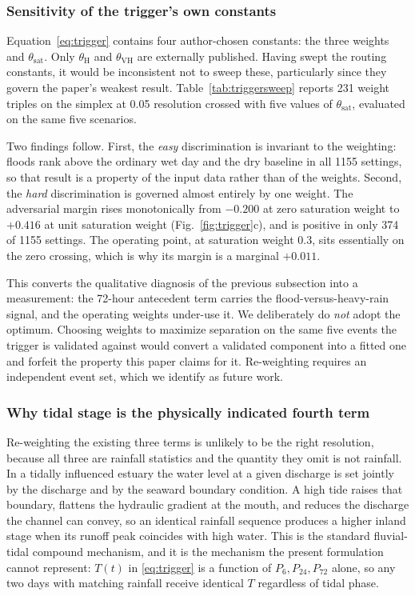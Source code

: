 \documentclass[10pt,twocolumn]{article}
\newcommand{\Tt}{T(t)}
\begin{document}
\subsubsection*{Sensitivity of the trigger's own constants}
\label{sec:res-trigger-sweep}
Equation~\eqref{eq:trigger} contains four author-chosen constants: the three
weights and $\theta_{\mathrm{sat}}$. Only $\theta_{\mathrm{H}}$ and
$\theta_{\mathrm{VH}}$ are externally published. Having swept the routing
constants, it would be inconsistent not to sweep these, particularly since they
govern the paper's weakest result. Table~\ref{tab:triggersweep} reports 231
weight triples on the simplex at 0.05 resolution crossed with five values of
$\theta_{\mathrm{sat}}$, evaluated on the same five scenarios.

Two findings follow. First, the \emph{easy} discrimination is invariant to the
weighting: floods rank above the ordinary wet day and the dry baseline in all
\num{1155} settings, so that result is a property of the input data rather than
of the weights.
Second, the \emph{hard} discrimination is governed almost entirely by one weight.
The adversarial margin rises monotonically from $-0.200$ at zero saturation
weight to $+0.416$ at unit saturation weight
(Fig.~\ref{fig:trigger}c), and is positive in only 374 of \num{1155} settings.
The operating point, at saturation weight 0.3, sits essentially on the zero
crossing, which is why its margin is a marginal $+0.011$.

This converts the qualitative diagnosis of the previous subsection into a
measurement: the 72-hour antecedent term carries the flood-versus-heavy-rain
signal, and the operating weights under-use it. We deliberately do \emph{not}
adopt the optimum. Choosing weights to maximize separation on the same five
events the trigger is validated against would convert a validated component into
a fitted one and forfeit the property this paper claims for it. Re-weighting
requires an independent event set, which we identify as future work.

\subsubsection*{Why tidal stage is the physically indicated fourth term}
Re-weighting the existing three terms is unlikely to be the right resolution,
because all three are rainfall statistics and the quantity they omit is not
rainfall. In a tidally influenced estuary the water level at a given discharge is
set jointly by the discharge and by the seaward boundary condition. A high tide
raises that boundary, flattens the hydraulic gradient at the mouth, and reduces
the discharge the channel can convey, so an identical rainfall sequence produces a
higher inland stage when its runoff peak coincides with high water. This is the
standard fluvial-tidal compound mechanism, and it is the mechanism the present
formulation cannot represent: $\Tt$ in \eqref{eq:trigger} is a function of
$P_6, P_{24}, P_{72}$ alone, so any two days with matching rainfall receive
identical $T$ regardless of tidal phase.
\end{document}
